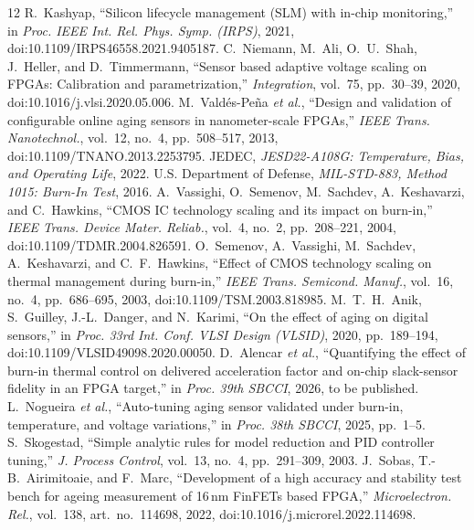 \documentclass[10pt,twocolumn]{article}
\begin{document}
\renewcommand{\refname}{References}\begin{thebibliography}{12}
\footnotesize
 R.~Kashyap, ``Silicon lifecycle management (SLM) with in-chip monitoring,'' in \emph{Proc. IEEE Int. Rel. Phys. Symp. (IRPS)}, 2021, doi:10.1109/IRPS46558.2021.9405187.
 C.~Niemann, M.~Ali, O.~U.~Shah, J.~Heller, and D.~Timmermann, ``Sensor based adaptive voltage scaling on FPGAs: Calibration and parametrization,'' \emph{Integration}, vol.~75, pp.~30--39, 2020, doi:10.1016/j.vlsi.2020.05.006.
 M.~Vald\'es-Pe\~na \emph{et al.}, ``Design and validation of configurable online aging sensors in nanometer-scale FPGAs,'' \emph{IEEE Trans. Nanotechnol.}, vol.~12, no.~4, pp.~508--517, 2013, doi:10.1109/TNANO.2013.2253795.
 JEDEC, \emph{JESD22-A108G: Temperature, Bias, and Operating Life}, 2022.
 U.S. Department of Defense, \emph{MIL-STD-883, Method 1015: Burn-In Test}, 2016.
 A.~Vassighi, O.~Semenov, M.~Sachdev, A.~Keshavarzi, and C.~Hawkins, ``CMOS IC technology scaling and its impact on burn-in,'' \emph{IEEE Trans. Device Mater. Reliab.}, vol.~4, no.~2, pp.~208--221, 2004, doi:10.1109/TDMR.2004.826591.
 O.~Semenov, A.~Vassighi, M.~Sachdev, A.~Keshavarzi, and C.~F.~Hawkins, ``Effect of CMOS technology scaling on thermal management during burn-in,'' \emph{IEEE Trans. Semicond. Manuf.}, vol.~16, no.~4, pp.~686--695, 2003, doi:10.1109/TSM.2003.818985.
 M.~T.~H.~Anik, S.~Guilley, J.-L.~Danger, and N.~Karimi, ``On the effect of aging on digital sensors,'' in \emph{Proc. 33rd Int. Conf. VLSI Design (VLSID)}, 2020, pp.~189--194, doi:10.1109/VLSID49098.2020.00050.
 D.~Alencar \emph{et al.}, ``Quantifying the effect of burn-in thermal control on delivered acceleration factor and on-chip slack-sensor fidelity in an FPGA target,'' in \emph{Proc. 39th SBCCI}, 2026, to be published.
 L.~Nogueira \emph{et al.}, ``Auto-tuning aging sensor validated under burn-in, temperature, and voltage variations,'' in \emph{Proc. 38th SBCCI}, 2025, pp.~1--5.
 S.~Skogestad, ``Simple analytic rules for model reduction and PID controller tuning,'' \emph{J. Process Control}, vol.~13, no.~4, pp.~291--309, 2003.
 J.~Sobas, T.-B.~Airimitoaie, and F.~Marc, ``Development of a high accuracy and stability test bench for ageing measurement of 16\,nm FinFETs based FPGA,'' \emph{Microelectron. Rel.}, vol.~138, art.~no.~114698, 2022, doi:10.1016/j.microrel.2022.114698.
\end{thebibliography}
\end{document}
